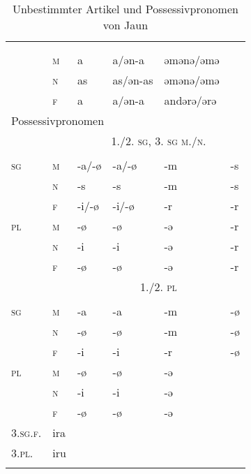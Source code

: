\begin{table}[H]
	\caption{Unbestimmter Artikel und Possessivpronomen von Jaun \citep[277-278, 284-285]{Stucki1917}}\label{table106}
	\begin{tabular}{llllll}
		\lsptoprule
		\multicolumn{6}{l}{unbestimmter Artikel} \\
		&  & \NOM & \AKK & \DAT & \\\midrule
		& \textsc{m} & a & a/ən-a & əmənə/əmə & \\
		& \textsc{n} & as & as/ən-as & əmənə/əmə & \\
		& \textsc{f} & a & a/ən-a & andərə/ərə & \\ \midrule
		\multicolumn{6}{l}{Possessivpronomen} \\
		& & \multicolumn{4}{c}{\scshape 1./2. \textsc{sg}, 3. \textsc{sg} m./n.}\\\cmidrule(lr){1-6}
		&  & \NOM & \AKK & \DAT & \GEN\\\midrule
		\textsc{sg} & \textsc{m} & {}-a/-ø & {}-a/-ø & {}-m & {}-s\\
		& \textsc{n} & {}-s & {}-s & {}-m & {}-s\\
		& \textsc{f} & {}-i/-ø & {}-i/-ø & {}-r & {}-r\\
		\textsc{pl} & \textsc{m} & {}-ø & {}-ø & {}-ə & {}-r\\
		& \textsc{n} & {}-i & {}-i & {}-ə & {}-r\\
		& \textsc{f} & {}-ø & {}-ø & {}-ə & {}-r\\\midrule
		& & \multicolumn{4}{c}{\scshape 1./2. \textsc{pl}}\\\cmidrule(lr){1-6}
		&  & \NOM & \AKK & \DAT & \GEN\\\midrule
		\textsc{sg} & \textsc{m} & {}-a & {}-a & {}-m & {}-ø\\
		& \textsc{n} & {}-ø & {}-ø & {}-m & {}-ø\\
		& \textsc{f} & {}-i & {}-i & {}-r & {}-ø\\
		\textsc{pl} & \textsc{m} & {}-ø & {}-ø & {}-ə & \\
		& \textsc{n} & {}-i & {}-i & {}-ə & \\
		& \textsc{f} & {}-ø & {}-ø & {}-ə & \\
		\midrule
		\textsc{3.sg.f.} & ira &  &  &  & \\
		\textsc{3.pl.} & iru &  &  &  & \\
		\lspbottomrule
	\end{tabular}
\end{table}


